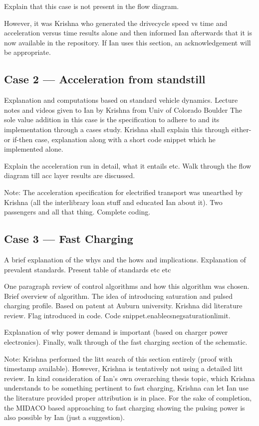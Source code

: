 Explain that this case is not present in the flow diagram.

However, it was Krishna who generated the drivecycle speed vs time and
acceleration versus time results alone and then informed Ian afterwards that it
is now available in the repository. If Ian uses this section, an acknowledgement
will be appropriate.


\subsection{Case 2 --- Acceleration from standstill}

Explanation and computations based on standard vehicle dynamics. Lecture notes
and videos given to Ian by Krishna from Univ of Colorado Boulder The sole value
addition in this case is the specification to adhere to and its implementation
through a cases study. Krishna shall explain this through either-or if-then
case, explanation along with a short code snippet which he implemented alone.

Explain the acceleration run in detail, what it entails etc. Walk through the
flow diagram till acc layer results are discussed.

Note: The acceleration specification for electrified transport was unearthed by
Krishna (all the interlibrary loan stuff and educated Ian about it). Two
passengers and all that thing. Complete coding.

\subsection{Case 3 --- Fast Charging}

A brief explanation of the whys and the hows and implications. Explanation of
prevalent standards. Present table of standards etc etc

One paragraph review of control algorithms and how this algorithm was chosen.
Brief overview of algorithm. The idea of introducing saturation and pulsed
charging profile. Based on patent at Auburn university. Krishna did literature
review. Flag introduced in code. Code snippet.enablecsnegsaturationlimit.

Explanation of why power demand is important (based on charger power electronics).
Finally, walk through of the fast charging section of the schematic.

Note: Krishna performed the litt search of this section entirely (proof with
timestamp available). However, Krishna is tentatively not using a detailed litt
review. In kind consideration of Ian's own overarching thesis topic, which
Krishna understands to be something pertinent to fast charging, Krishna can let
Ian use the literature provided proper attribution is in place. For the sake of
completion, the MIDACO based approaching to fast charging showing the pulsing
power is also possible by Ian (just a suggestion).

